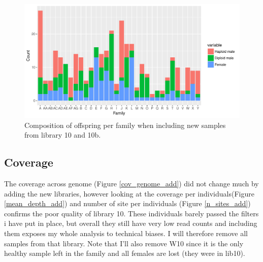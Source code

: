 \documentclass[10pt,a4paper]{report}
\begin{document}
\begin{figure}[h]
	\begin{center}
		\includegraphics[width=\textwidth]{add_samples/off_comp.pdf}
		\caption{Composition of offspring per family when including new samples from library 10 and 10b.}
		\label{off_comp}
	\end{center}
\end{figure}

\subsection{Coverage}
\label{sec:add_coverage}

The coverage across genome (Figure \ref{cov_genome_add}) did not change much by adding the new libraries, however looking at the coverage per individuals(Figure \ref{mean_depth_add}) and number of site per individuals (Figure \ref{n_sites_add}) confirms the poor quality of library 10. These individuals barely passed the filters i have put in place, but overall they still have very low read counts and including them exposes my whole analysis to technical biases. I will therefore remove all samples from that library. Note that I'll also remove W10 since it is the only healthy sample left in the family and all females are lost (they were in lib10).
\end{document}
